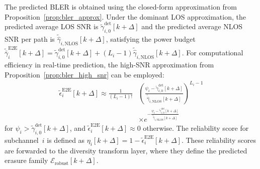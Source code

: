 \documentclass[journal]{IEEEtran}
\begin{document}
The predicted BLER is obtained using the closed-form approximation from Proposition~\ref{prop:bler_approx}. Under the dominant LOS approximation, the predicted average LOS SNR is $\tilde{\gamma}_{i,0}^{\mathrm{det}}[k+\Delta]$ and the predicted average NLOS SNR per path is $\tilde{\hat{\gamma}}_{i,\mathrm{NLOS}}[k+\Delta]$, satisfying the power budget $\tilde{\bar{\gamma}}_{i}^{\mathrm{E2E}}[k+\Delta] = \tilde{\gamma}_{i,0}^{\mathrm{det}}[k+\Delta] + (L_i-1)\tilde{\hat{\gamma}}_{i,\mathrm{NLOS}}[k+\Delta]$. For computational efficiency in real-time prediction, the high-SNR approximation from Proposition~\ref{prop:bler_high_snr} can be employed:
\begin{equation}
\begin{split}
\tilde{\epsilon}_{i}^{\mathrm{E2E}}[k+\Delta] \approx \frac{1}{(L_i-1)!} &\left(\frac{\psi_i - \tilde{\gamma}_{i,0}^{\mathrm{det}}[k+\Delta]}{\tilde{\hat{\gamma}}_{i,\mathrm{NLOS}}[k+\Delta]}\right)^{L_i-1} \\
&\times e^{-\frac{\psi_i - \tilde{\gamma}_{i,0}^{\mathrm{det}}[k+\Delta]}{\tilde{\hat{\gamma}}_{i,\mathrm{NLOS}}[k+\Delta]}}
\end{split}
\label{eq:predicted_bler}
\end{equation}
for $\psi_i > \tilde{\gamma}_{i,0}^{\mathrm{det}}[k+\Delta]$, and $\tilde{\epsilon}_{i}^{\mathrm{E2E}}[k+\Delta] \approx 0$ otherwise. The reliability score for subchannel~$i$ is defined as
$
\eta_i[k+\Delta] = 1 - \tilde{\epsilon}_{i}^{\mathrm{E2E}}[k+\Delta].
$
These reliability scores are forwarded to the diversity transform 
layer, where they define the predicted erasure family 
$\mathcal{E}_{\mathrm{robust}}[k+\Delta]$.
\end{document}
